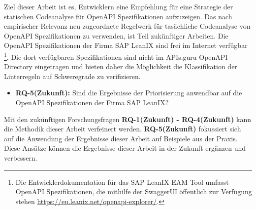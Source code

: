   Ziel dieser Arbeit ist es, Entwicklern eine Empfehlung für eine Strategie der statischen Codeanalyse für OpenAPI Spezifikationen aufzuzeigen. Das nach empirischer Relevanz neu zugeordnete Regelwerk für tasächliche Codeanalyse von OpenAPI Spezifikationen zu verwenden, ist Teil zukünftiger Arbeiten. Die OpenAPI Spezifikationen der Firma SAP LeanIX sind frei im Internet verfügbar \footnote{Die Entwicklerdokumentation für das SAP LeanIX \acf{EAM} Tool umfasst OpenAPI Spezifikationen, die mithilfe der SwaggerUI öffentlich zur Verfügung stehen \href{https://eu.leanix.net/openapi-explorer/}{https://eu.leanix.net/openapi-explorer/}.}. Die dort verfügbaren Spezifikationen sind nicht im APIs.guru OpenAPI Directory eingetragen und bieten daher die Möglichkeit die Klassifikation der Linterregeln auf Schweregrade zu verifizieren.
  
  \begin{itemize}
    \item \textbf{RQ-5(Zukunft):} Sind die Ergebnisse der Priorisierung anwendbar auf die OpenAPI Spezifikationen der Firma SAP LeanIX?
  \end{itemize}

  Mit den zukünftigen Forschungsfragen \textbf{RQ-1(Zukunft) - RQ-4(Zukunft)} kann die Methodik dieser Arbeit verfeinert werden. \textbf{RQ-5(Zukunft)} fokussiert sich auf die Anwendung der Ergebnisse dieser Arbeit auf Beispiele aus der Praxis. Diese Ansätze können die Ergebnisse dieser Arbeit in der Zukunft ergänzen und verbessern.
